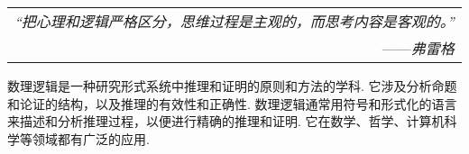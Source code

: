 \begin{flushright}
    \begin{tabular}{r||||}
        \textit{“把心理和逻辑严格区分，思维过程是主观的，而思考内容是客观的。”}\\
        ——\textit{弗雷格}
    \end{tabular}
\end{flushright}

数理逻辑是一种研究形式系统中推理和证明的原则和方法的学科. 它涉及分析命题和论证的结构，以及推理的有效性和正确性. 数理逻辑通常用符号和形式化的语言来描述和分析推理过程，以便进行精确的推理和证明. 它在数学、哲学、计算机科学等领域都有广泛的应用. 